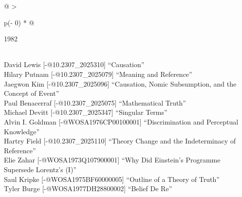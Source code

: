 \documentclass[
  10pt,
  letterpaper,
  DIV=11,
  numbers=noendperiod,
  twoside]{scrartcl}
\begin{document}
\begin{longtable}[]{@{}
  >{\raggedright\arraybackslash}p{(\columnwidth - 0\tabcolsep) * }@{}}

\caption{\label{tbl-top-ten-1973}Most cited articles published less than
ten years ago as of 1982.}

\tabularnewline

\toprule\noalign{}
\begin{minipage}[b]{\linewidth}\raggedright
1982
\end{minipage} \\
\midrule\noalign{}
\endhead
\bottomrule\noalign{}
\endlastfoot
David Lewis {[}-@10.2307\_2025310{]} ``Causation'' \\
Hilary Putnam {[}-@10.2307\_2025079{]} ``Meaning and Reference'' \\
Jaegwon Kim {[}-@10.2307\_2025096{]} ``Causation, Nomic Subsumption, and
the Concept of Event'' \\
Paul Benacerraf {[}-@10.2307\_2025075{]} ``Mathematical Truth'' \\
Michael Devitt {[}-@10.2307\_2025347{]} ``Singular Terms'' \\
Alvin I. Goldman {[}-@WOSA1976CP00100001{]} ``Discrimination and
Perceptual Knowledge'' \\
Hartry Field {[}-@10.2307\_2025110{]} ``Theory Change and the
Indeterminacy of Reference'' \\
Elie Zahar {[}-@WOSA1973Q107900001{]} ``Why Did Einstein's Programme
Supersede Lorentz's (I)'' \\
Saul Kripke {[}-@WOSA1975BF60000005{]} ``Outline of a Theory of
Truth'' \\
Tyler Burge {[}-@WOSA1977DH28800002{]} ``Belief De Re'' \\

\end{longtable}
\end{document}
